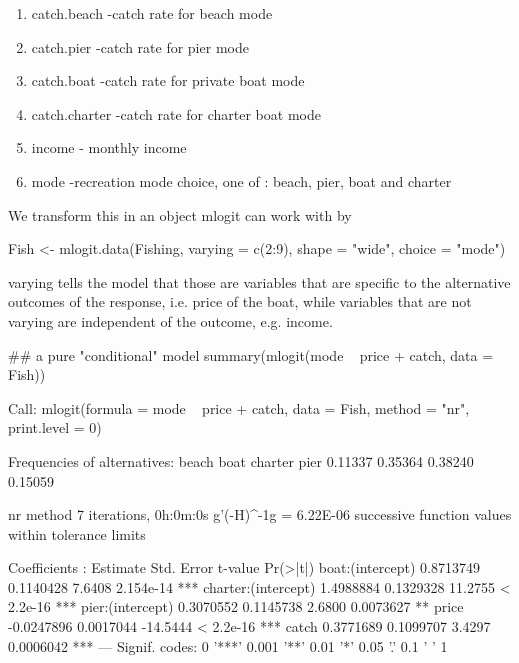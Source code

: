 \documentclass[a4paper,twoside]{tufte-book}\usepackage[]{graphicx}\usepackage[]{color}
\begin{document}
\begin{appendices}
\begin{enumerate}
\item catch.beach -catch rate for beach mode

\item catch.pier -catch rate for pier mode

\item catch.boat -catch rate for private boat mode

\item catch.charter -catch rate for charter boat mode

\item income - monthly income

\item mode -recreation mode choice, one of : beach, pier, boat and charter

\end{enumerate}

We transform this in an object mlogit can work with by

\begin{Schunk}
\begin{Sinput}
Fish <- mlogit.data(Fishing, varying = c(2:9), shape = "wide", choice = "mode")
\end{Sinput}
\end{Schunk}

varying tells the model that those are variables that are specific to the alternative outcomes of the response, i.e. price of the boat, while variables that are not varying are independent of the outcome, e.g. income. 

\begin{Schunk}
\begin{Sinput}
## a pure "conditional" model
summary(mlogit(mode ~ price + catch, data = Fish))
\end{Sinput}
\begin{Soutput}

Call:
mlogit(formula = mode ~ price + catch, data = Fish, method = "nr", 
    print.level = 0)

Frequencies of alternatives:
  beach    boat charter    pier 
0.11337 0.35364 0.38240 0.15059 

nr method
7 iterations, 0h:0m:0s 
g'(-H)^-1g = 6.22E-06 
successive function values within tolerance limits 

Coefficients :
                      Estimate Std. Error  t-value  Pr(>|t|)    
boat:(intercept)     0.8713749  0.1140428   7.6408 2.154e-14 ***
charter:(intercept)  1.4988884  0.1329328  11.2755 < 2.2e-16 ***
pier:(intercept)     0.3070552  0.1145738   2.6800 0.0073627 ** 
price               -0.0247896  0.0017044 -14.5444 < 2.2e-16 ***
catch                0.3771689  0.1099707   3.4297 0.0006042 ***
---
Signif. codes:  0 '***' 0.001 '**' 0.01 '*' 0.05 '.' 0.1 ' ' 1


\end{Soutput}
\end{Schunk}
\end{appendices}
\end{document}
